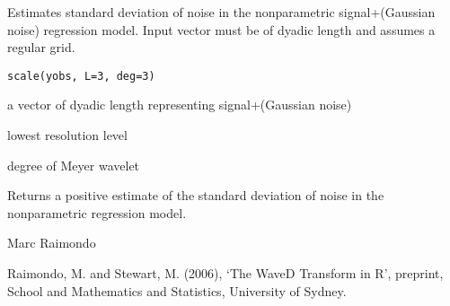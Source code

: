 \documentclass{article}
\begin{document}
\begin{Description}\relax
Estimates standard deviation of noise in the nonparametric 
signal+(Gaussian noise)
regression  model. Input vector must be of dyadic length
and assumes a regular grid.
\end{Description}
\begin{Usage}
\begin{verbatim}
scale(yobs, L=3, deg=3)
\end{verbatim}
\end{Usage}
\begin{Arguments}
\begin{ldescription}
\item[\code{yobs}] a vector of dyadic length representing signal+(Gaussian noise)
\item[\code{L}] lowest resolution level
\item[\code{deg}] degree of Meyer wavelet
\end{ldescription}
\end{Arguments}
\begin{Value}
Returns a positive 
estimate  of the standard deviation of noise in the nonparametric 
regression  model.
\end{Value}
\begin{Author}\relax
Marc Raimondo
\end{Author}
\begin{References}\relax
Raimondo, M. and Stewart, M. (2006),
`The WaveD Transform in R', preprint, School and Mathematics and Statistics,
University of Sydney.
\end{References}
\begin{SeeAlso}\relax
{}
\end{SeeAlso}
\begin{Examples}
\end{Examples}
\end{document}
